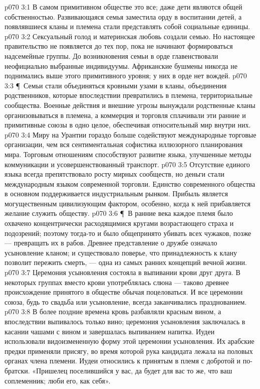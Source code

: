 \vs p070 3:1 В самом примитивном обществе  это все; даже дети являются общей собственностью. Развивающаяся семья заместила орду в воспитании детей, а появлявшиеся кланы и племена стали представлять собой социальные единицы.
\vs p070 3:2 Сексуальный голод и материнская любовь создали семью. Но настоящее правительство не появляется до тех пор, пока не начинают формироваться надсемейные группы. До возникновения семьи в орде главенствовали неофициально выбранные индивидуумы. Африканские бушмены никогда не поднимались выше этого примитивного уровня; у них в орде нет вождей.
\vs p070 3:3 \P\ Семьи стали объединяться кровными узами в кланы, объединения родственников, которые впоследствии превратились в племена, территориальные сообщества. Военные действия и внешние угрозы вынуждали родственные кланы организовываться в племена, а коммерция и торговля сплачивали эти ранние и примитивные союзы в одно целое, обеспечивая относительный мир внутри них.
\vs p070 3:4 Миру на Урантии гораздо больше содействуют международные торговые организации, чем вся сентиментальная софистика иллюзорного планирования мира. Торговым отношениям способствуют развитие языка, улучшенные методы коммуникации и усовершенствованный транспорт.
\vs p070 3:5 Отсутствие единого языка всегда препятствовало росту мирных сообществ, но деньги стали международным языком современной торговли. Единство современного общества в основном поддерживается индустриальным рынком. Прибыль является могущественным цивилизующим фактором, особенно, когда к ней прибавляется желание служить обществу.
\vs p070 3:6 \P\ В ранние века каждое племя было охвачено концентрически расходящимися кругами возрастающего страха и подозрений; поэтому тогда\hyp{}то и было общепринято убивать всех чужаков, позже --- превращать их в рабов. Древнее представление о дружбе означало усыновление кланом; и существовало поверье, что принадлежность к клану позволит пережить смерть, --- одна из самых ранних концепций вечной жизни.
\vs p070 3:7 Церемония усыновления состояла в выпивании крови друг друга. В некоторых группах вместо крови употреблялась слюна --- таково древнее происхождение принятого в обществе обычая поцеловаться. И все церемонии союза, будь то свадьба или усыновление, всегда заканчивались празднованием.
\vs p070 3:8 В более поздние времена кровь разбавляли красным вином, а впоследствии выпивалось только вино; церемония усыновления заключалась в касании чашами с вином и завершалась выпиванием напитка. Иудеи использовали видоизмененную форму этой церемонии усыновления. Их арабские предки применяли присягу, во время которой рука кандидата лежала на половых органах члена племени. Иудеи относились к принятым в племя с добротой и по\hyp{}братски. «Пришелец поселившийся у вас, да будет для вас то же, что ваш соплеменник; люби его, как себя».
